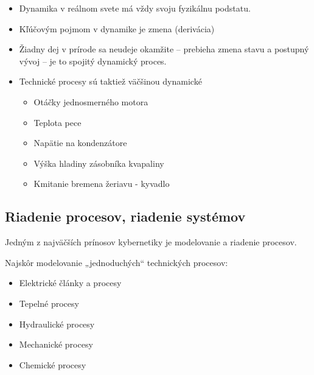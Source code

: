 \documentclass[a4paper, 10pt, ]{article}
\begin{document}
\smallskip


\begin{itemize}[leftmargin=0pt, labelsep=3mm, itemsep=0pt]
    \item Dynamika v reálnom svete má vždy svoju fyzikálnu podstatu.
    \item Kľúčovým pojmom v dynamike je zmena (derivácia)
    \item Žiadny dej v prírode sa neudeje okamžite – prebieha zmena stavu a postupný vývoj – je to spojitý dynamický proces.
    \item Technické procesy sú taktiež väčšinou dynamické
    \begin{itemize}
        \item Otáčky jednosmerného motora
        \item Teplota pece
        \item Napätie na kondenzátore
        \item Výška hladiny zásobníka kvapaliny
        \item Kmitanie bremena žeriavu - kyvadlo
    \end{itemize}
\end{itemize}






\pagebreak

\begin{centering}


    \vspace{-8mm}


\end{centering}

\pagebreak



\subsection{Riadenie procesov, riadenie systémov}

Jedným z najväčších prínosov kybernetiky je modelovanie a riadenie procesov.

Najskôr modelovanie „jednoduchých“ technických procesov:
\begin{itemize}
    \item Elektrické články a procesy
    \item Tepelné procesy
    \item Hydraulické procesy
    \item Mechanické procesy
    \item Chemické procesy
\end{itemize}
\end{document}
